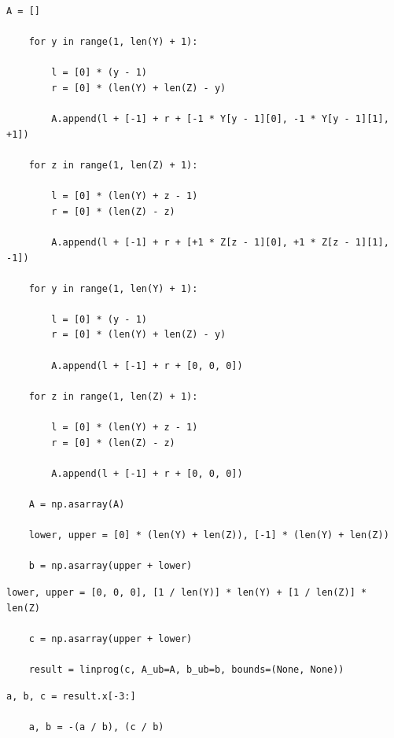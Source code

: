 \documentclass[12pt]{article}
\begin{document}
\pagebreak

\begin{lstlisting}[caption={Calculating matrix \textbf{A} and vector \textbf{b}}]
    A = []

    for y in range(1, len(Y) + 1):

        l = [0] * (y - 1)
        r = [0] * (len(Y) + len(Z) - y)

        A.append(l + [-1] + r + [-1 * Y[y - 1][0], -1 * Y[y - 1][1], +1])

    for z in range(1, len(Z) + 1):

        l = [0] * (len(Y) + z - 1)
        r = [0] * (len(Z) - z)

        A.append(l + [-1] + r + [+1 * Z[z - 1][0], +1 * Z[z - 1][1], -1])

    for y in range(1, len(Y) + 1):

        l = [0] * (y - 1)
        r = [0] * (len(Y) + len(Z) - y)

        A.append(l + [-1] + r + [0, 0, 0])

    for z in range(1, len(Z) + 1):

        l = [0] * (len(Y) + z - 1)
        r = [0] * (len(Z) - z)

        A.append(l + [-1] + r + [0, 0, 0])

    A = np.asarray(A)

    lower, upper = [0] * (len(Y) + len(Z)), [-1] * (len(Y) + len(Z))

    b = np.asarray(upper + lower)
\end{lstlisting}

\begin{lstlisting}[caption={Defining vector \textbf{c} and finding a solution to the problem}]
    lower, upper = [0, 0, 0], [1 / len(Y)] * len(Y) + [1 / len(Z)] * len(Z)

    c = np.asarray(upper + lower)

    result = linprog(c, A_ub=A, b_ub=b, bounds=(None, None))
\end{lstlisting}

\begin{lstlisting}[caption={Determining the slope and the y-intercept of the separating line}]
    a, b, c = result.x[-3:]

    a, b = -(a / b), (c / b)
\end{lstlisting}
\end{document}
